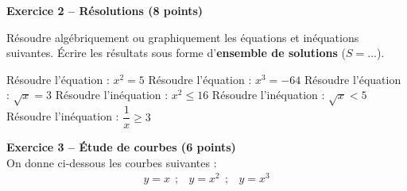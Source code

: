 \documentclass[12pt,a4paper]{exam}
\begin{document}
\noindent\hrulefill
\vspace{0.5cm}


\textbf{Exercice 2 – Résolutions (8 points)}
\vspace{5pt}

Résoudre algébriquement ou graphiquement les équations et inéquations suivantes. Écrire 
les résultats sous forme d'\textbf{ensemble de solutions} ($S = ...$).

\vspace{5pt}

\begin{questions}
    \question Résoudre l'équation : $x^2 = 5$
    \question Résoudre l'équation : $x^3 = -64$
    \question Résoudre l'équation : $\sqrt{x} = 3$
    \question Résoudre l'inéquation : $x^2 \leq 16$
    \question Résoudre l'inéquation : $\sqrt{x} < 5$
    \question Résoudre l'inéquation : $\dfrac{1}{x} \geq 3$
\end{questions}

\noindent\hrulefill
\vspace{0.5cm}


\textbf{Exercice 3 – Étude de courbes (6 points)}
\vspace{5pt}
\\On donne ci-dessous les courbes suivantes :
\[
\begin{array}{ccc}
    y = x \ \ ;
    & y = x^2 \ \ ;
    & y = x^3
\end{array}
\]

\begin{center}
\end{center}
\end{document}
